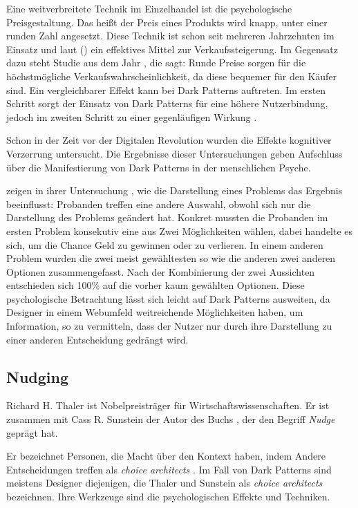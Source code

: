 \documentclass[conference,compsoc,final,a4paper]{IEEEtran}
\begin{document}
Eine weitverbreitete Technik im Einzelhandel ist die psychologische Preisgestaltung. Das heißt der Preis eines Produkts wird knapp, unter einer runden Zahl angesetzt. Diese Technik ist schon seit mehreren Jahrzehnten im Einsatz und laut \citeauthor{Bizer_2005} () \autocite{Bizer_2005} ein effektives Mittel zur Verkaufssteigerung. Im Gegensatz dazu steht \citeauthor{Wieseke_2015} \autocite{Wieseke_2015} Studie aus dem Jahr , die sagt: Runde Preise sorgen für die höchstmögliche Verkaufswahrscheinlichkeit, da diese bequemer für den Käufer sind. Ein vergleichbarer Effekt kann bei Dark Patterns auftreten. Im ersten Schritt sorgt der Einsatz von Dark Patterns für eine höhere Nutzerbindung, jedoch im zweiten Schritt zu einer gegenläufigen Wirkung \autocite{M.Bhoot2020}.

Schon in der Zeit vor der Digitalen Revolution wurden die Effekte kognitiver Verzerrung untersucht. Die Ergebnisse dieser Untersuchungen geben Aufschluss über die Manifestierung von Dark Patterns in der menschlichen Psyche.

\citeauthor{Tversky453} zeigen in ihrer Untersuchung \autocite{Tversky453}, wie die Darstellung eines Problems das Ergebnis beeinflusst: Probanden treffen eine andere Auswahl, obwohl sich nur die Darstellung des Problems geändert hat. Konkret mussten die Probanden im ersten Problem konsekutiv eine aus Zwei Möglichkeiten wählen, dabei handelte es sich, um die Chance Geld zu gewinnen oder zu verlieren. In einem anderen Problem wurden die zwei meist gewähltesten so wie die anderen zwei anderen Optionen zusammengefasst. Nach der Kombinierung der zwei Aussichten entschieden sich 100\% auf die vorher kaum gewählten Optionen. Diese psychologische Betrachtung lässt sich leicht auf Dark Patterns ausweiten, da Designer in einem Webumfeld weitreichende Möglichkeiten haben, um Information, so zu vermitteln, dass der Nutzer nur durch ihre Darstellung zu einer anderen Entscheidung gedrängt wird.
\subsection{Nudging}
Richard H. Thaler ist Nobelpreisträger für Wirtschaftswissenschaften. Er ist zusammen mit Cass R. Sunstein der Autor des Buchs  \autocite{Thaler2008}, der den Begriff \textit{Nudge} geprägt hat.

Er bezeichnet Personen, die Macht über den Kontext haben, indem Andere Entscheidungen treffen als \textit{choice architects} \autocite[S. 3]{Thaler2008}. Im Fall von Dark Patterns sind meistens Designer diejenigen, die Thaler und Sunstein als \textit{choice architects} bezeichnen. Ihre Werkzeuge sind die psychologischen Effekte und Techniken.
\end{document}

